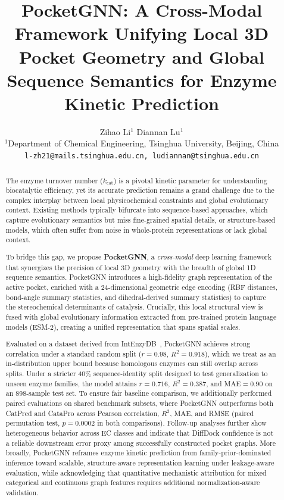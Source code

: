 \documentclass[11pt]{article}
\title{\textbf{PocketGNN: A Cross-Modal Framework Unifying Local 3D Pocket Geometry and Global Sequence Semantics for Enzyme Kinetic Prediction}}
\author{
  Zihao Li$^{1}$ \quad Diannan Lu$^{1}$\\[3pt]
  $^{1}$Department of Chemical Engineering, Tsinghua University, Beijing, China\\
  \texttt{l-zh21@mails.tsinghua.edu.cn, ludiannan@tsinghua.edu.cn}
}
\date{}
\begin{document}
\maketitle

\begin{abstract}
The enzyme turnover number ($k_{\text{cat}}$) is a pivotal kinetic parameter for understanding biocatalytic efficiency, yet its accurate prediction remains a grand challenge due to the complex interplay between local physicochemical constraints and global evolutionary context. Existing methods typically bifurcate into sequence-based approaches, which capture evolutionary semantics but miss fine-grained spatial details, or structure-based models, which often suffer from noise in whole-protein representations or lack global context.

To bridge this gap, we propose \textbf{PocketGNN}, a \emph{cross-modal} deep learning framework that synergizes the precision of local 3D geometry with the breadth of global 1D sequence semantics. PocketGNN introduces a high-fidelity graph representation of the active pocket, enriched with a 24-dimensional geometric edge encoding (RBF distances, bond-angle summary statistics, and dihedral-derived summary statistics) to capture the stereochemical determinants of catalysis. Crucially, this local structural view is fused with global evolutionary information extracted from pre-trained protein language models (ESM-2), creating a unified representation that spans spatial scales.

Evaluated on a dataset derived from IntEnzyDB~\citep{yan2022intenzydb}, PocketGNN achieves strong correlation under a standard random split ($r=0.98$, $R^2=0.918$), which we treat as an in-distribution upper bound because homologous enzymes can still overlap across splits. Under a stricter 40\% sequence-identity split designed to test generalization to unseen enzyme families, the model attains $r=0.716$, $R^2=0.387$, and MAE$=0.90$ on an 898-sample test set. To ensure fair baseline comparison, we additionally performed paired evaluations on shared benchmark subsets, where PocketGNN outperforms both CatPred and CataPro across Pearson correlation, $R^2$, MAE, and RMSE (paired permutation test, $p=0.0002$ in both comparisons). Follow-up analyses further show heterogeneous behavior across EC classes and indicate that DiffDock confidence is not a reliable downstream error proxy among successfully constructed pocket graphs. More broadly, PocketGNN reframes enzyme kinetic prediction from family-prior-dominated inference toward scalable, structure-aware representation learning under leakage-aware evaluation, while acknowledging that quantitative mechanistic attribution for mixed categorical and continuous graph features requires additional normalization-aware validation.
\end{abstract}
\end{document}
